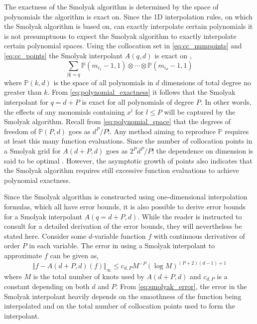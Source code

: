 The exactness of the Smolyak algorithm is determined by the space of polynomials the algorithm is exact on. Since the 1D interpolation rules, on which the Smolyak algorithm is based on, can exactly interpolate certain polynomials it is not presumptuous to expect the Smolyak algorithm to exactly interpolate certain polynomial spaces. Using the collocation set in \ref{eq:cc_numpoints} and \ref{eq:cc_points} the Smolyak interpolant $A(q,d)$ is exact on \cite{NovakRitter},
\begin{equation} \label{eq:polynomial_exactness}
    \sum_{\vert\textbf{i}\vert = q}
     \mathbb{P}(m_{i_1}-1,1)\otimes\cdots\otimes
      \mathbb{P}(m_{i_d}-1,1)
\end{equation} 
where $\mathbb{P}(k,d)$ is the space of all polynomials in $d$ dimensions of total degree no greater than $k$. From \ref{eq:polynomial_exactness} it follows that the Smolyak interpolant for $q=d+P$ is exact for all polynomials of degree $P$. In other words, the effects of any monomials containing $x^l$ for $l\leq P$ will be captured by the Smolyak algorithm. Recall from \ref{eq:polynomial_space} that the degrees of freedom of $\mathbb{P}(P,d)$ goes as $d^P/P!$. Any method aiming to reproduce $\mathbb{P}$ requires at least this many function evaluations. Since the number of collocation points in a Smolyak grid for $A(d+P,d)$ goes as $2^{P}d^{P}/P!$ the dependence on dimension is said to be optimal \cite{NovakRitter}. However, the asymptotic growth of points also indicates that the Smolyak algorithm requires still excessive function evaluations to achieve polynomial exactness.     

Since the Smolyak algorithm is constructed using one-dimensional interpolation formulas, which all have error bounds, it is also possible to derive error bounds for a Smolyak interpolant $A(q=d+P,d)$. While the reader is instructed to consult \cite{NovakRitter} for a detailed derivation of the error bounds, they will nevertheless be stated here. Consider some $d$-variable function $f$ with continuous derivatives of order $P$ in each variable. The error in using a Smolyak interpolant to approximate $f$ can be given as,
\begin{equation} \label{eq:smolyak_error}
    \Vert f-A(d+P,d)(f)\Vert_{\infty} \leq 
     c_{d,P} M^{-P} (\log M)^{(P+2)(d-1)+1}
\end{equation}
where $M$ is the total number of knots used by $A(d+P,d)$ and $c_{d,P}$ is a constant depending on both $d$ and $P$. From \ref{eq:smolyak_error}, the error in the Smolyak interpolant heavily depends on the smoothness of the function being interpolated and on the total number of collocation points used to form the interpolant.       
  